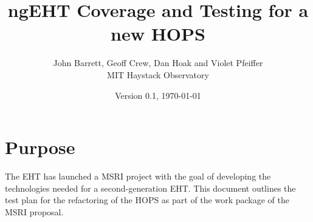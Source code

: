 \documentclass[notitlepage,letterpaper,pdftex,12pt,final]{article}
\numberwithin{equation}{section}
\newcommand{\recdate}{\today}
\begin{document}

\setlength\headheight{15pt}
\fancyhead[C]{}
\fancyfoot[L]{\recdate}

\title{ngEHT Coverage and Testing for a new HOPS}

\author{%
\LARGE John Barrett, Geoff Crew, Dan Hoak and Violet Pfeiffer \\
\Large MIT Haystack Observatory}
\date{Version 0.1, \recdate}
\maketitle
\normalsize

\renewcommand\abstractname{Executive Summary}

\pagebreak
\tableofcontents


%
% 
%

\section{Purpose}
\label{sec:purpose}
The \ac{EHT} has launched a \ac{MSRI} project with the goal of developing
the technologies needed for a second-generation \acs{EHT}. 
This document outlines the test plan for the refactoring of the \ac{HOPS}
as part of the work package of the \acs{MSRI} proposal. 
\end{document}
